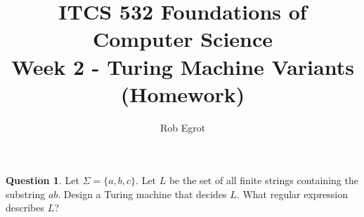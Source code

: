 \documentclass{article}
\title{ITCS 532 Foundations of Computer Science\\
Week 2 - Turing Machine Variants (Homework)}
\author{Rob Egrot}
\date{}
\theoremstyle{definition}
\newtheorem{Q}{Question}
\newcommand{\tvs}{\textvisiblespace}
\newcommand{\ra}{\rightarrow}
\begin{document}
\maketitle

\begin{Q}
Let $\Sigma=\{a,b,c\}$. Let $L$ be the set of all finite strings containing the substring $ab$. Design a Turing machine that decides $L$. What regular expression describes $L$?
\end{Q}
\begin{comment}
\textbf{Solution}
\begin{center}
\begin{tikzpicture}[scale=0.2]
\tikzstyle{every node}+=[inner sep=0pt]
\draw [black] (15.4,-24.4) circle (3);
\draw (15.4,-24.4) node {$q_0$};
\draw [black] (26.9,-24.4) circle (3);
\draw (26.9,-24.4) node {$a$};
\draw [black] (39.3,-24.4) circle (3);
\draw (39.3,-24.4) node {$b$};
\draw [black] (50.4,-24.4) circle (3);
\draw (50.4,-24.4) node {$A$};
\draw [black] (50.4,-24.4) circle (2.4);
\draw [black] (26.9,-37.1) circle (3);
\draw (26.9,-37.1) node {$R$};
\draw [black] (26.9,-37.1) circle (2.4);
\draw [black] (18.4,-24.4) -- (23.9,-24.4);
\fill [black] (23.9,-24.4) -- (23.1,-23.9) -- (23.1,-24.9);
\draw (21.15,-24.9) node [below] {$:,\ra$};
\draw [black] (29.478,-22.889) arc (111.61948:68.38052:9.829);
\fill [black] (36.72,-22.89) -- (36.16,-22.13) -- (35.79,-23.06);
\draw (33.1,-21.7) node [above] {$a,\ra$};
\draw [black] (25.577,-21.72) arc (234:-54:2.25);
\draw (26.9,-17.15) node [above] {$\{b,c\},\ra$};
\fill [black] (28.22,-21.72) -- (29.1,-21.37) -- (28.29,-20.78);
\draw [black] (26.9,-27.4) -- (26.9,-34.1);
\fill [black] (26.9,-34.1) -- (27.4,-33.3) -- (26.4,-33.3);
\draw (26.4,-30.75) node [left] {$\tvs,\tvs$};
\draw [black] (37.2,-26.55) -- (29,-34.95);
\fill [black] (29,-34.95) -- (29.91,-34.73) -- (29.2,-34.03);
\draw (33.63,-32.22) node [right] {$\tvs,\tvs$};
\draw [black] (42.3,-24.4) -- (47.4,-24.4);
\fill [black] (47.4,-24.4) -- (46.6,-23.9) -- (46.6,-24.9);
\draw (44.85,-24.9) node [below] {$b,b$};
\draw [black] (37.977,-21.72) arc (234:-54:2.25);
\draw (39.3,-17.15) node [above] {$a,\ra$};
\fill [black] (40.62,-21.72) -- (41.5,-21.37) -- (40.69,-20.78);
\draw [black] (36.558,-25.599) arc (-73.45716:-106.54284:12.146);
\fill [black] (29.64,-25.6) -- (30.27,-26.31) -- (30.55,-25.35);
\draw (33.1,-26.6) node [below] {$c,\ra$};
\end{tikzpicture}
\end{center}

The regular expression is $\cdot ab \cdot$ if we treat the alphabet as implicit, or, if we want to specify the alphabet, we could use $(a|b|c)^\ast ab (a|b|c)^\ast$ .
\end{comment}
\end{document}
